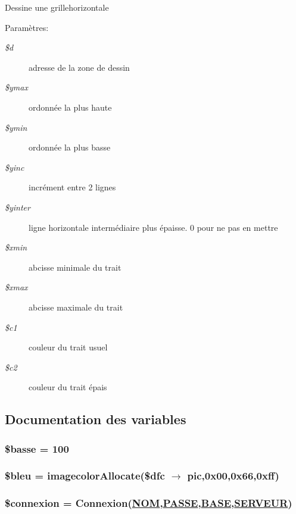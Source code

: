 Dessine une grillehorizontale \begin{Desc}
\item[Param\`{e}tres:]
\begin{description}
\item[{\em \$d}]adresse de la zone de dessin \item[{\em \$ymax}]ordonn\'{e}e la plus haute \item[{\em \$ymin}]ordonn\'{e}e la plus basse \item[{\em \$yinc}]incr\'{e}ment entre 2 lignes \item[{\em \$yinter}]ligne horizontale interm\'{e}diaire plus \'{e}paisse. 0 pour ne pas en mettre \item[{\em \$xmin}]abcisse minimale du trait \item[{\em \$xmax}]abcisse maximale du trait \item[{\em \$c1}]couleur du trait usuel \item[{\em \$c2}]couleur du trait \'{e}pais \end{description}
\end{Desc}


\subsection{Documentation des variables}
\hypertarget{graphe__veille__samu_8php_a14}{
\subsubsection[\$basse]{\setlength{\rightskip}{0pt plus 5cm}\$basse = 100}}
\label{graphe__veille__samu_8php_a14}


\hypertarget{graphe__veille__samu_8php_a19}{
\subsubsection[\$bleu]{\setlength{\rightskip}{0pt plus 5cm}\$bleu = imagecolor\-Allocate(\$dfc $\rightarrow$ pic,0x00,0x66,0xff)}}
\label{graphe__veille__samu_8php_a19}


\hypertarget{graphe__veille__samu_8php_a22}{
\subsubsection[\$connexion]{\setlength{\rightskip}{0pt plus 5cm}\$connexion = Connexion(\hyperlink{pma__connect_8php_a0}{NOM},\hyperlink{pma__connect_8php_a1}{PASSE},\hyperlink{pma__connect_8php_a3}{BASE},\hyperlink{pma__connect_8php_a2}{SERVEUR})}}
\label{graphe__veille__samu_8php_a22}


